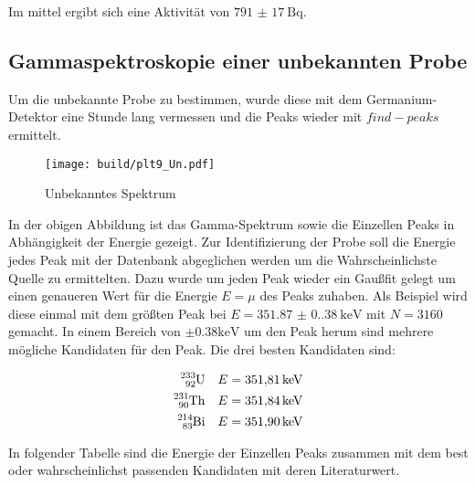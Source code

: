 Im mittel ergibt sich eine Aktivität von $\qty{791(17)}{\becquerel}$.

\subsection{Gammaspektroskopie einer unbekannten Probe}
Um die unbekannte Probe zu bestimmen, wurde diese mit dem Germanium-Detektor eine Stunde lang vermessen und die Peaks wieder mit $find-peaks$ ermittelt. 

\begin{figure}[H]
	\centering
	\texttt{[image: build/plt9\_Un.pdf]}
	\caption{Unbekanntes Spektrum}
	\label{fig:Un_spektrum}
\end{figure}

In der obigen Abbildung ist das Gamma-Spektrum sowie die Einzellen Peaks in Abhängigkeit der Energie gezeigt. 
Zur Identifizierung der Probe soll die Energie jedes Peak mit der Datenbank \cite{nuclear} abgeglichen werden um die Wahrscheinlichste Quelle zu ermittelten. 
Dazu wurde um jeden Peak wieder ein Gaußfit gelegt um einen genaueren Wert für die Energie $E=\mu$ des Peaks zuhaben. 
Als Beispiel wird diese einmal mit dem größten Peak bei $E=\qty{351.87(0.38)}{\kilo\eV}$ mit $N=3160$ gemacht. 
In einem Bereich von $\pm 0.38\unit{\kilo\eV}$ um den Peak herum sind mehrere mögliche Kandidaten für den Peak.
Die drei besten Kandidaten sind: 

\begin{align*}
	\ce{^{233}_{92}U}&  &E=\qty{351.81}{\kilo\eV}\\
	\ce{^{231}_{90}Th}& &E=\qty{351.84}{\kilo\eV}\\
	\ce{^{214}_{83}Bi}& &E=\qty{351.90}{\kilo\eV}\\
\end{align*}

In folgender Tabelle sind die Energie der Einzellen Peaks zusammen mit dem best oder wahrscheinlichst passenden Kandidaten mit deren Literaturwert. 

